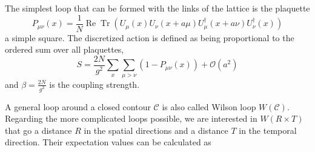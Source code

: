 \documentclass[%
 reprint,
 amsmath,amssymb,
 aps,
]{revtex4-1}
\DeclareMathOperator{\Tr}{Tr}
\renewcommand{\Re}{\operatorname{Re}}
\begin{document}
The simplest loop that can be formed with the links of the lattice is the plaquette \[P_{\mu\nu}(x)=\frac{1}{N}\Re\Tr\left(U_\mu(x)U_\nu(x+a\mu)U_\mu^\dagger(x+a\nu)U^\dagger_\nu(x)\right)\] a simple square. The discretized action is defined as being proportional to the ordered sum over all plaquettes, \[S=\frac{2N}{g^2}\sum_{x}\sum_{\mu>\nu}\left(1-P_{\mu\nu}(x)\right)+\mathcal{O}(a^2)\]
and $\beta=\frac{2N}{g^2}$ is the coupling strength. 


%
%


A general loop around a closed contour $\mathcal{C}$ is also called Wilson loop $W(\mathcal{C})$. Regarding the more complicated loops possible, we are interested in $W(R\times T)$ that go a distance $R$ in the spatial directions and a distance $T$ in the temporal direction. Their expectation values can be calculated as 
\end{document}
